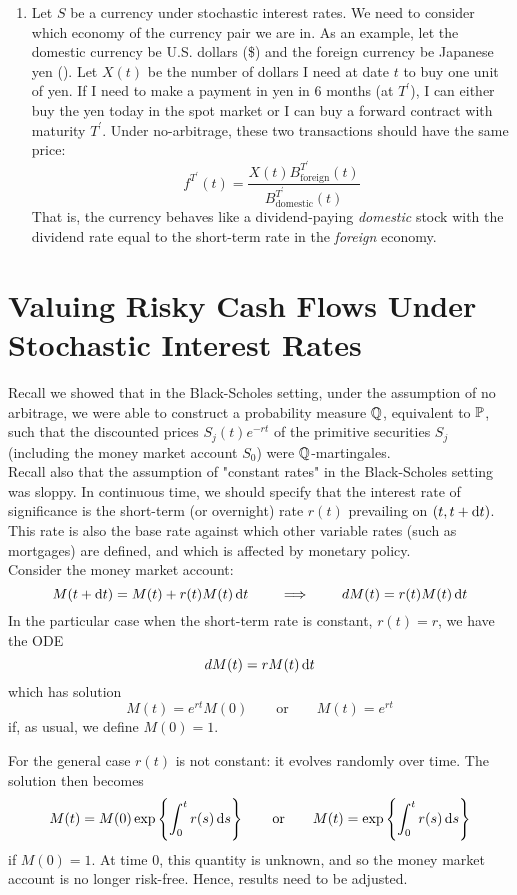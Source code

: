 \documentclass[11pt]{article}
\begin{document}
\begin{enumerate}
\item Let $S$ be a currency under stochastic interest rates. We need to consider which economy of the currency pair we are in. As an example, let the domestic currency be U.S. dollars (\$) and the foreign currency be Japanese yen (\yen). Let $X(t)$ be the number of dollars I need at date $t$ to buy one unit of yen. If I need to make a payment in yen in 6 months (at $T^\prime$), I can either buy the yen today in the spot market or I can buy a forward contract with maturity $T^\prime$. Under no-arbitrage, these two transactions should have the same price:
$$f^{T^\prime}(t) = \frac{X(t) B^{T^\prime}_{\text{foreign}}(t)}{B^{T^\prime}_{\text{domestic}}(t)}$$
That is, the currency behaves like a dividend-paying {\em domestic} stock with the dividend rate equal to the short-term rate in the {\em foreign} economy.
\end{enumerate}

\section{Valuing Risky Cash Flows Under Stochastic Interest Rates}

Recall we showed that in the Black-Scholes setting, under the assumption of no arbitrage, we were able to construct a probability measure $\operatorname{\mathbb Q}$, equivalent to $\operatorname{\mathbb P}$, such that the discounted prices $S_j(t)e^{-rt}$ of the primitive securities $S_j$ (including the money market account $S_0$) were $\operatorname{\mathbb Q}$-martingales. \\

Recall also that the assumption of "constant rates" in the Black-Scholes setting was sloppy. In continuous time, we should specify that the interest rate of significance is the short-term (or overnight) rate $r(t)$ prevailing on $(t, t + \dif t)$. This rate is also the base rate against which other variable rates (such as mortgages) are defined, and which is affected by monetary policy. \\

Consider the money market account:
$$ M(t + \dif t) = M(t) + r(t) M(t) \dif t \qquad \implies \qquad dM(t) = r(t) M(t) \dif t$$
In the particular case when the short-term rate is constant, $r(t) = r$, we have the ODE 
$$dM(t) = r M(t) \dif t$$
which has solution
$$M(t) = e^{rt} M(0) \qquad \text{or} \qquad M(t) = e^{rt}$$
if, as usual, we define $M(0) = 1$.

For the general case $r(t)$ is not constant: it evolves randomly over time. The solution then becomes
$$M(t) = M(0) \exp \left\{ \int_0^t r(s) \dif s\right\} \qquad \text{or} \qquad M(t) = \exp \left\{ \int_0^t r(s) \dif s\right\}$$
if $M(0) = 1$. At time 0, this quantity is unknown, and so the money market account is no longer risk-free. Hence, results need to be adjusted. \\
\end{document}
